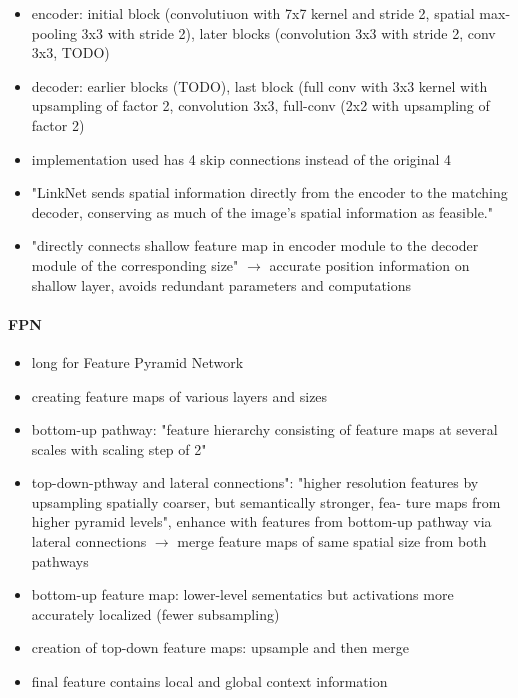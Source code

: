 \begin{itemize}
	\item encoder: initial block (convolutiuon with 7x7 kernel and stride 2, spatial max-pooling 3x3 with stride 2), later blocks (convolution 3x3 with stride 2, conv 3x3, TODO) \cite{linknet}
	\item decoder: earlier blocks (TODO), last block (full conv with 3x3 kernel with upsampling of factor 2, convolution 3x3, full-conv (2x2 with upsampling of factor 2)
	\item implementation used has 4 skip connections instead of the original 4 \cite{SegmentationModels}
	\item "LinkNet sends spatial information directly from the encoder to the matching decoder, conserving as much of the image’s spatial information as feasible."
	\item "directly connects shallow feature map in encoder module to the decoder module of the corresponding size" $\rightarrow$ accurate position information on shallow layer, avoids redundant parameters and computations \cite{Norelyaqine2023}
\end{itemize}

\paragraph{FPN}

\begin{itemize}
	\item long for Feature Pyramid Network
	\item creating feature maps of various layers and sizes \cite{Norelyaqine2023}
	\item bottom-up pathway: "feature hierarchy consisting of feature maps at several scales with scaling step of 2"\cite{fpn}
	\item top-down-pthway and lateral connections": "higher resolution features by upsampling spatially coarser, but semantically stronger, fea- ture maps from higher pyramid levels", enhance with features from bottom-up pathway via lateral connections $\rightarrow$ merge feature maps of same spatial size from both pathways\cite{fpn}
	\item bottom-up feature map: lower-level sementatics but activations more accurately localized (fewer subsampling)\cite{fpn}
	\item creation of top-down feature maps: upsample and then merge\cite{fpn}
	\item final feature contains local and global context information\cite{fpn}
\end{itemize}


